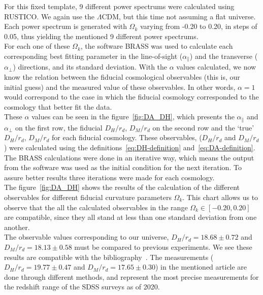 For this fixed template, 9 different power spectrums were calculated using RUSTICO\@. We again use the $\Lambda$CDM, but this time not assuming a flat universe. Each power spectrum is generated with $\Omega_k$ varying from -0.20 to 0.20, in steps of 0.05, thus yielding the mentioned 9 different power spectrums. \\

For each one of these $\Omega_k$, the software BRASS was used to calculate each corresponding best fitting parameter in the line-of-sight ($\alpha_\parallel$) and the transverse ($\alpha_\perp$) directions, and its standard deviation. With the $\alpha$ values calculated, we now know the relation between the fiducial cosmological observables (this is, our initial guess) and the measured value of these observables. In other words, $\alpha=1$ would correspond to the case in which the fiducial cosmology corresponded to the cosmology that better fit the data.\\

These $\alpha$ values can be seen in the figure~\ref{fig:DA_DH}, which presents the $\alpha_\parallel$ and $\alpha_\perp$ on the first row, the fiducial $D_H / r_d$, $D_M/r_d $ on the second row and the `true' $D_H / r_d$, $D_M /r_d$ for each fiducial cosmology.  
These observables, ($D_H /r_d$ and $D_M /r_d $) were calculated using the definitions~\eqref{eq:DH-definition} and~\eqref{eq:DA-definition}. \\

The BRASS calculations were done in an iterative way, which means the output from the software was used as the initial condition for the next iteration. To assure better results three iterations were made for each cosmology.  \\

The figure~\ref{fig:DA_DH} shows the results of the calculation of the different observables for different fiducial curvature parameters $\Omega_k$. This chart allows us to observe that the all the calculated observables in the range $\Omega_k  \in \left[ -0.20, 0.20   \right] $ are compatible, since they all stand at less than one standard deviation from one another. \\

The observable values corresponding to our universe, $D_H/r_d = 18.68 \pm 0.72$ and $D_M/r_d = 18.13 \pm 0.58$ must be compared to previous experiments. We see these results are compatible with the bibliography~\cite{hector}. The measurements ($D_H/r_d = 19.77\pm0.47$ and $D_M/ r_d=17.65\pm 0.30$) in the mentioned article are done through different methods, and represent the most precise measurements for the redshift range of the SDSS surveys as of 2020.

